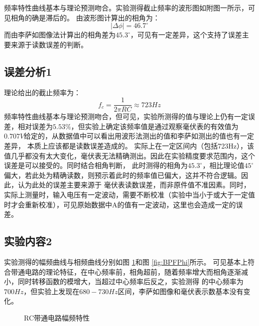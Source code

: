 \documentclass[a4paper,11pt,UTF8]{ctexart}
\begin{document}
  频率特性曲线基本与理论预测吻合。实验测得截止频率的波形图如附图一所示，可见相角的确是滞后的。
  由波形图计算出的相角为：
  \begin{equation}
    |\Delta \phi|=46.7^\circ
  \end{equation}
  而由李萨如图像法计算出的相角差为$45.3^\circ$，可见有一定差异，这个支持了误差主要来源于读数误差的判断。
\subsection{误差分析1}
  理论给出的截止频率为：
  \begin{equation}
    f_c=\frac{1}{2\pi RC}\approx723Hz
  \end{equation}
  频率特性曲线基本与理论预测吻合，但可见，实验所测得的值与理论上仍有一定误差，相对误差为$5.53\%$，但实验上确定该频率值是通过观察毫伏表的有效值为$0.707V$给定的，从数据值中可以看出用波形法测出的值和李萨如测出的值也有一定差异，
  本质上应该都是读数误差造成的。
  实际上在一定区间内（包括723Hz），该值几乎都没有太大变化，毫伏表无法精确测出。因此在实验精度要求范围内，这个误差是可以接受的。同时结合相角判断，
  此时测得的相角为$45.3^\circ$，相比理论值$45^\circ$偏大，若此处为精确读数，则预示着此时的频率值已偏大，这并不符合逻辑。因此，认为此处的误差主要来源于
  毫伏表读数误差，而非原件值不准因素。同时，实际上测量时，输入电压有一定波动，需要不断校准（实验中当小于或大于一定值时才会重新校准），可见原始数据中A的值有一定波动，这里也会造成一定的误差。

\subsection{实验内容2}
实验测得的幅频曲线与相频曲线分别如图 \ref{fig:BPFH}和图 \ref{fig:BPFPhi}所示。 可见基本上符合带通电路的理论特征，在中心频率前，相角超前，随着频率增大而相角逐渐减小，同时转移函数的模增大，当超过中心频率后反之，实验测得
的中心频率为$700Hz$，但实验上发现在$680-730Hz$区间，李萨如图像和毫伏表示数基本没有变化。
\begin{figure}[htbp]
  \centering
  \caption{RC带通电路幅频特性}
  \label{fig:BPFH}
  \end{figure}
\end{document}
